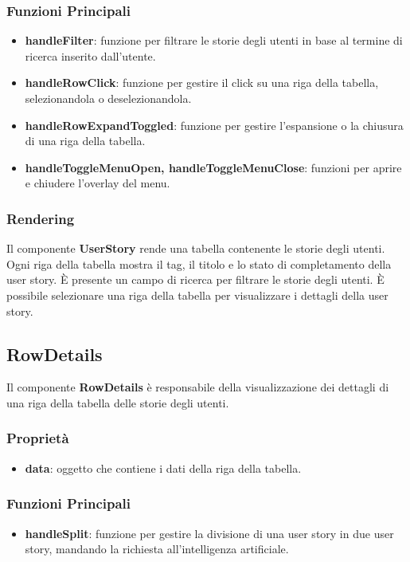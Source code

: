 \documentclass{article}
\begin{document}
\subsubsection*{Funzioni Principali}
\begin{itemize}
    \item \textbf{handleFilter}: funzione per filtrare le storie degli utenti in base al termine di ricerca inserito dall'utente.
    \item \textbf{handleRowClick}: funzione per gestire il click su una riga della tabella, selezionandola o deselezionandola.
    \item \textbf{handleRowExpandToggled}: funzione per gestire l'espansione o la chiusura di una riga della tabella.
    \item \textbf{handleToggleMenuOpen, handleToggleMenuClose}: funzioni per aprire e chiudere l'overlay del menu.
\end{itemize}

\subsubsection*{Rendering}
Il componente \textbf{UserStory} rende una tabella contenente le storie degli utenti. Ogni riga della tabella mostra il tag, il titolo e lo stato di completamento della user story. È presente un campo di ricerca per filtrare le storie degli utenti. È possibile selezionare una riga della tabella per visualizzare i dettagli della user story.

\subsection*{RowDetails}
Il componente \textbf{RowDetails} è responsabile della visualizzazione dei dettagli di una riga della tabella delle storie degli utenti.

\subsubsection*{Proprietà}

\begin{itemize}
    \item \textbf{data}: oggetto che contiene i dati della riga della tabella.
\end{itemize}

\subsubsection*{Funzioni Principali}
\begin{itemize}
    \item \textbf{handleSplit}: funzione per gestire la divisione di una user story in due user story, mandando la richiesta all'intelligenza artificiale.
\end{itemize}
\end{document}
